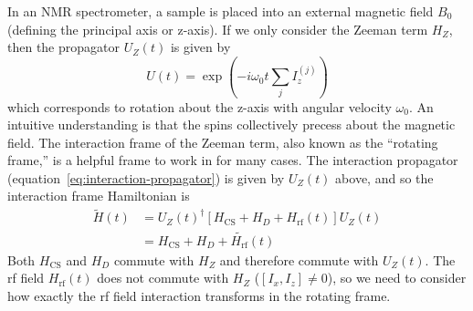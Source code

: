 In an NMR spectrometer, a sample is placed into an external magnetic field $B_0$ (defining the principal axis or z-axis).
If we only consider the Zeeman term $H_Z$, then the propagator $U_Z(t)$ is given by
\[
U(t) = \exp \left( -i \omega_0 t \sum_j I_z^{(j)} \right)
\]
which corresponds to rotation about the z-axis with angular velocity $\omega_0$. An intuitive understanding is that the spins collectively precess about the magnetic field. The interaction frame of the Zeeman term, also known as the ``rotating frame,'' is a helpful frame to work in for many cases. The interaction propagator (equation~\ref{eq:interaction-propagator}) is given by $U_Z(t)$ above, and so the interaction frame Hamiltonian is
\begin{align*}
    \widetilde{H}(t) &= {U_Z(t)}^{\dagger} \left[ H_\text{CS} + H_D + H_\text{rf}(t) \right] U_Z(t) \\
        &= H_\text{CS} + H_D + \widetilde{H_\text{rf}}(t)
\end{align*}
Both $H_\text{CS}$ and $H_D$ commute with $H_Z$ and therefore commute with $U_Z(t)$. The rf field $H_\text{rf}(t)$ does not commute with $H_Z$ ($[I_x, I_z] \ne 0$), so we need to consider how exactly the rf field interaction transforms in the rotating frame.


